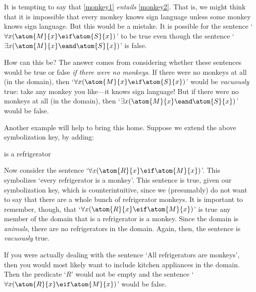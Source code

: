 It is tempting to say that \cref*{monkey1} \emph{entails} \cref*{monkey2}. That is, we might think that it is impossible that every monkey knows sign language unless some monkey knows sign language. But this would be a mistake. It is possible for the sentence `$\forall x(\atom{M}{x} \eif \atom{S}{x})$' to be true even though the sentence `$\exists x(\atom{M}{x} \eand \atom{S}{x})$' is false.

How can this be? The answer comes from considering whether these sentences would be true or false \emph{if there were no monkeys}. If there were no monkeys at all (in the domain), then `$\forall x(\atom{M}{x} \eif \atom{S}{x})$' would be \emph{vacuously} true: take any monkey you like---it knows sign language! But if there were no monkeys at all (in the domain), then `$\exists x(\atom{M}{x} \eand \atom{S}{x})$' would be false.

Another example will help to bring this home. Suppose we extend the above symbolization key, by adding:
	\begin{ekey}
		\item[\atom{R}{x}]  is a refrigerator
	\end{ekey}
Now consider the sentence `$\forall x(\atom{R}{x} \eif \atom{M}{x})$'. This symbolizes `every refrigerator is a monkey'. This sentence is true, given our symbolization key, which is counterintuitive, since we (presumably) do not want to say that there are a whole bunch of refrigerator monkeys. It is important to remember, though, that `$\forall x(\atom{R}{x} \eif \atom{M}{x})$' is true \ifeff{} any member of the domain that is a refrigerator is a monkey. Since the domain is \emph{animals}, there are no refrigerators in the domain. Again, then, the sentence is \emph{vacuously} true.

If you were actually dealing with the sentence `All refrigerators are monkeys', then you would most likely want to include kitchen appliances in the domain. Then the predicate `$R$' would not be empty and the sentence `$\forall x(\atom{R}{x} \eif \atom{M}{x})$' would be false.


